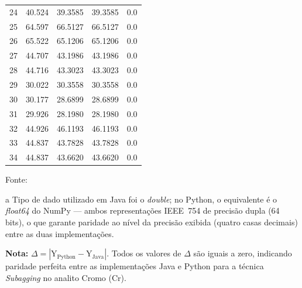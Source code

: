 \begin{table}[H]
\begin{threeparttable}
{\begin{tabular}{
    S[table-format=2.0]
    S[table-format=2.3]
    S[table-format=2.4]
    S[table-format=2.4]
    S[table-format=1.1]
}
24  & 40.524  & 39.3585  & 39.3585  & 0.0 \\
25  & 64.597  & 66.5127  & 66.5127  & 0.0 \\
26  & 65.522  & 65.1206  & 65.1206  & 0.0 \\
27  & 44.707  & 43.1986  & 43.1986  & 0.0 \\
28  & 44.716  & 43.3023  & 43.3023  & 0.0 \\
29  & 30.022  & 30.3558  & 30.3558  & 0.0 \\
30  & 30.177  & 28.6899  & 28.6899  & 0.0 \\
31  & 29.926  & 28.1980  & 28.1980  & 0.0 \\
32  & 44.926  & 46.1193  & 46.1193  & 0.0 \\
33  & 44.837  & 43.7828  & 43.7828  & 0.0 \\
34  & 44.837  & 43.6620  & 43.6620  & 0.0 \\
\bottomrule
\end{tabular}%
}
\begin{center}
\begin{minipage}{0.85\linewidth}
\begin{tablenotes}
\footnotesize
\item Fonte:~\oautor
\item[a] Tipo de dado utilizado em Java foi o \textit{double}; no Python,
o equivalente é o \textit{float64} do NumPy — ambos representações IEEE~754
de precisão dupla (64 bits), o que garante paridade ao nível da precisão exibida (quatro casas decimais) entre as
duas implementações.
\item \textbf{Nota:} $\Delta = |\text{Y}_{\text{Python}} - \text{Y}_{\text{Java}}|$.
Todos os valores de $\Delta$ são iguais a zero, indicando paridade
perfeita entre as implementações Java e Python para a técnica \textit{Subagging}
no analito Cromo (Cr).
\end{tablenotes}
\end{minipage}
\end{center}
\end{threeparttable}
\end{table}



